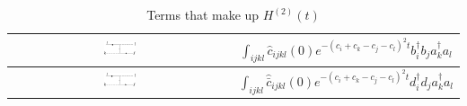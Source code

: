 \begin{table}[h]
    \centering
    \hspace*{-1.7cm} %
    \begin{tabular}{|c|c|}
        \hline
        \includegraphics[width=0.15\textwidth]{figures/f-inst.pdf} & 
        {\small $\displaystyle 
        \int_{ijkl} \hat c_{ijkl}(0) e^{-\left(c_i + c_k - c_j - c_l \right)^2t} b_i^\dagger b_j a_k^\dagger a_l
        $} \\
        \hline
        \includegraphics[width=0.15\textwidth]{figures/fbar-inst.pdf} & 
        {\small $\displaystyle 
        \int_{ijkl} \hat{\bar{c}}_{ijkl}(0) e^{-\left(c_i + c_k - c_j - c_l \right)^2t} d_i^\dagger d_j a_k^\dagger a_l
        $} \\
        \hline

    \end{tabular}
    \caption{Terms that make up $H^{(2)}(t)$} 
    \label{tab:H2}

\end{table}